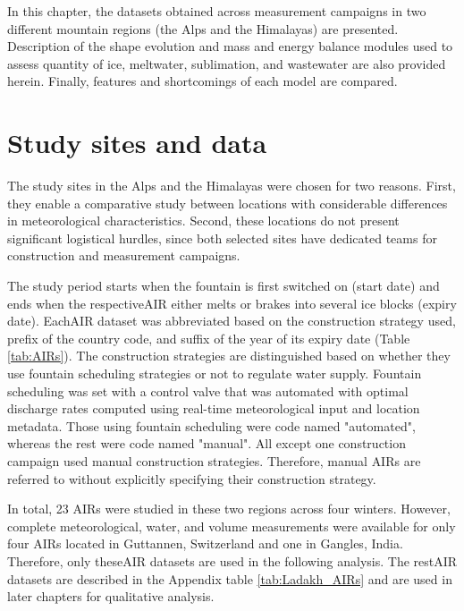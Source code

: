 In this chapter, the datasets obtained across measurement campaigns in two different mountain regions (the Alps and
the Himalayas) are presented. Description of the shape evolution and mass and energy balance modules used to assess quantity of ice, meltwater, sublimation, and wastewater are also provided herein.
Finally, features and shortcomings of each model are compared.

\section{Study sites and data}

The study sites in the Alps and the Himalayas were chosen for two reasons. First, they enable a
comparative study between locations with considerable differences in meteorological characteristics. Second,
these locations do not present significant logistical hurdles, since both selected sites have dedicated
teams for construction and measurement campaigns.

The study period starts when the fountain is first switched on (start date) and ends when the respective\ac{AIR}
either melts or brakes into several ice blocks (expiry date). Each\ac{AIR} dataset was abbreviated based on the
construction strategy used, prefix of the country code, and suffix of the year of its expiry date
(Table \ref{tab:AIRs}). The construction strategies are distinguished based on whether they use fountain scheduling
strategies or not to regulate water supply. Fountain scheduling was set with a control valve that was automated
with optimal discharge rates computed using real-time meteorological input and location metadata. Those using fountain scheduling were
code named "automated", whereas the rest were code named "manual". All except one construction campaign used
manual construction strategies. Therefore, manual \ac{AIRs} are referred to without explicitly
specifying their construction strategy.

In total, 23 \ac{AIRs} were studied in these two regions across four winters. However, complete meteorological, water, and volume measurements were available for only four \ac{AIRs} located in
Guttannen, Switzerland and one in Gangles, India. Therefore,
only these\ac{AIR} datasets are used in the following analysis. The rest\ac{AIR} datasets are described in the
Appendix table \ref{tab:Ladakh_AIRs} and are used in later chapters for qualitative analysis.


